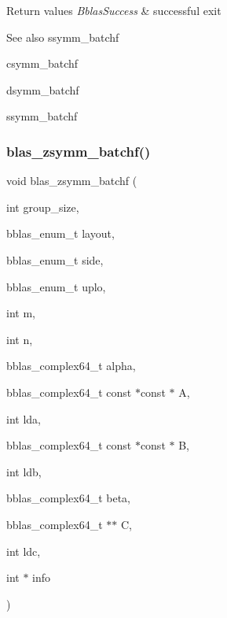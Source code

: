 \begin{DoxyRetVals}{Return values}
{\em Bblas\+Success} & successful exit\\
\hline
\end{DoxyRetVals}
\begin{DoxySeeAlso}{See also}
ssymm\+\_\+batchf 

csymm\+\_\+batchf 

dsymm\+\_\+batchf 

ssymm\+\_\+batchf 
\end{DoxySeeAlso}
\mbox{\label{group__symm__batchf_ga207ca7335041928197b6c1739e40cd46}} 
\subsubsection{\texorpdfstring{blas\+\_\+zsymm\+\_\+batchf()}{blas\_zsymm\_batchf()}}
{\footnotesize\ttfamily void blas\+\_\+zsymm\+\_\+batchf (\begin{DoxyParamCaption}\item[{int}]{group\+\_\+size,  }\item[{bblas\+\_\+enum\+\_\+t}]{layout,  }\item[{bblas\+\_\+enum\+\_\+t}]{side,  }\item[{bblas\+\_\+enum\+\_\+t}]{uplo,  }\item[{int}]{m,  }\item[{int}]{n,  }\item[{bblas\+\_\+complex64\+\_\+t}]{alpha,  }\item[{bblas\+\_\+complex64\+\_\+t const $\ast$const $\ast$}]{A,  }\item[{int}]{lda,  }\item[{bblas\+\_\+complex64\+\_\+t const $\ast$const $\ast$}]{B,  }\item[{int}]{ldb,  }\item[{bblas\+\_\+complex64\+\_\+t}]{beta,  }\item[{bblas\+\_\+complex64\+\_\+t $\ast$$\ast$}]{C,  }\item[{int}]{ldc,  }\item[{int $\ast$}]{info }\end{DoxyParamCaption})}

